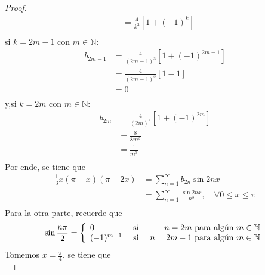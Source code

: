 \documentclass[12pt]{report}
\newcounter{it}
\theoremstyle{largebreak}
\renewcommand{\leq}{\ensuremath{\leqslant}}
\begin{document}
\begin{proof}
\begin{equation*}
\begin{split}
                &=\frac{4}{k^3}\left[1+(-1)^k\right]\\
            \end{split}
        \end{equation*}
        si $k=2m-1$ con $m\in\mathbb{N}$:
        \begin{equation*}
            \begin{split}
                b_{ 2m-1}&=\frac{4}{(2m-1)^3}\left[1+(-1)^{2m-1}\right]\\
                &=\frac{4}{(2m-1)^3}\left[1-1\right]\\
                &=0\\
            \end{split}
        \end{equation*}
        y,si $k=2m$ con $m\in\mathbb{N}$:
        \begin{equation*}
            \begin{split}
                b_{2m}&=\frac{4}{(2m)^3}\left[1+(-1)^{2m}\right]\\
                &=\frac{8}{8m^3}\\
                &=\frac{1}{m^3}\\
            \end{split}
        \end{equation*}
        Por ende, se tiene que
        \begin{equation*}
            \begin{split}
                \frac{1}{3}x(\pi-x)(\pi-2x)&=\sum_{n=1}^\infty b_{ 2n}\sin 2nx\\
                &=\sum_{n=1}^\infty\frac{\sin 2nx}{n^3},\quad\forall 0\leq x\leq\pi \\
            \end{split}
        \end{equation*}
        Para la otra parte, recuerde que
        \begin{equation*}
            \sin\frac{n\pi}{2}=\left\{
                \begin{array}{lcr}
                    0 & \textup{ si } & n=2m\textup{ para algún }m\in\mathbb{N}\\
                    (-1)^{m-1} & \textup{ si } & n=2m-1\textup{ para algún }m\in\mathbb{N} \\
                \end{array}
            \right.
        \end{equation*}
        Tomemos $x=\frac{\pi}{4}$, se tiene que
        \begin{equation*}

\end{equation*}
\end{proof}
\end{document}
